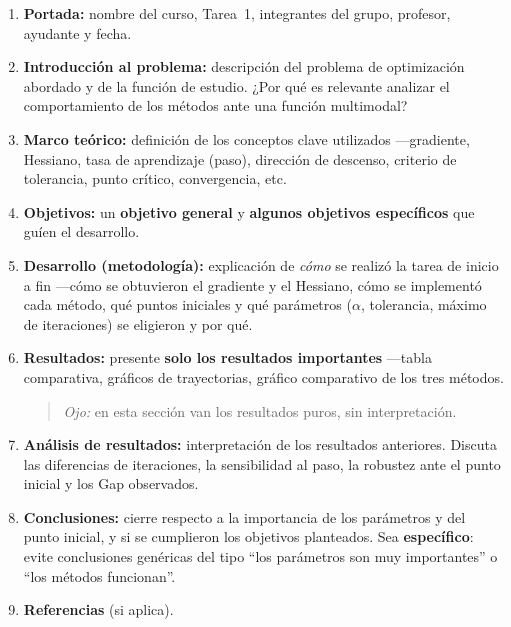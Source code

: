 \documentclass[12pt,a4paper]{article}
\begin{document}
\begin{enumerate}[leftmargin=*, topsep=2pt]
    \item \textbf{Portada:} nombre del curso, Tarea~1, integrantes del grupo,
          profesor, ayudante y fecha.
    \item \textbf{Introducción al problema:} descripción del problema de
          optimización abordado y de la función de estudio. ¿Por qué es
          relevante analizar el comportamiento de los métodos ante una función
          multimodal?
    \item \textbf{Marco teórico:} definición de los conceptos clave utilizados
          —gradiente, Hessiano, tasa de aprendizaje (paso), dirección de
          descenso, criterio de tolerancia, punto crítico, convergencia, etc.
    \item \textbf{Objetivos:} un \textbf{objetivo general} y 
          \textbf{algunos objetivos específicos} que guíen el desarrollo.
    \item \textbf{Desarrollo (metodología):} explicación de \emph{cómo} se
          realizó la tarea de inicio a fin —cómo se obtuvieron el gradiente y
          el Hessiano, cómo se implementó cada método, qué puntos iniciales y
          qué parámetros ($\alpha$, tolerancia, máximo de iteraciones) se
          eligieron y por qué.
    \item \textbf{Resultados:} presente \textbf{solo los resultados
          importantes} —tabla comparativa, gráficos de trayectorias, gráfico
          comparativo de los tres métodos.
          \begin{quote}
          \textit{Ojo:} en esta sección van los resultados puros, sin
          interpretación.
          \end{quote}
    \item \textbf{Análisis de resultados:} interpretación de los resultados
          anteriores. Discuta las diferencias de iteraciones, la sensibilidad
          al paso, la robustez ante el punto inicial y los Gap observados.
    \item \textbf{Conclusiones:} cierre respecto a la importancia de los
          parámetros y del punto inicial, y si se cumplieron los objetivos
          planteados. Sea \textbf{específico}: evite conclusiones genéricas del
          tipo ``los parámetros son muy importantes'' o ``los métodos
          funcionan''.
    \item \textbf{Referencias} (si aplica).
\end{enumerate}
\end{document}
